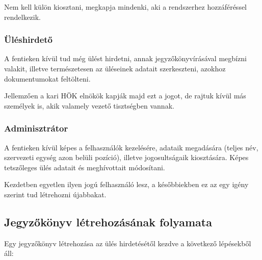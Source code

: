 \documentclass[a4paper,12pt,oneside]{report}
\begin{document}
Nem kell külön kiosztani, megkapja mindenki, aki a rendszerhez hozzáféréssel rendelkezik.

\subsubsection*{Üléshirdető}

A fentieken kívül tud még ülést hirdetni, annak jegyzőkönyvírásával megbízni valakit, illetve természetesen az üléseinek adatait szerkeszteni, azokhoz dokumentumokat feltölteni.

Jellemzően a kari HÖK elnökök kapják majd ezt a jogot, de rajtuk kívül más személyek is, akik valamely vezető tisztségben vannak.

\subsubsection*{Adminisztrátor}

A fentieken kívül képes a felhasználók kezelésére, adataik megadására (teljes név, szervezeti egység azon belüli pozíció), illetve jogosultságaik kiosztására. Képes tetszőleges ülés adatait és meghívottait módosítani.

Kezdetben egyetlen ilyen jogú felhasználó lesz, a későbbiekben ez az egy igény szerint tud létrehozni újabbakat.

\subsection{Jegyzőkönyv létrehozásának folyamata}

Egy jegyzőkönyv létrehozása az ülés hirdetésétől kezdve a következő lépésekből áll:
\end{document}
